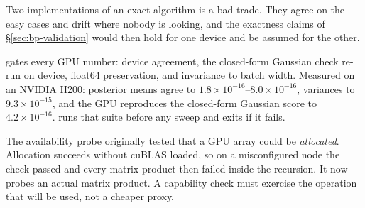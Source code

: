 \begin{intuition}
Two implementations of an exact algorithm is a bad trade. They agree on the easy cases and
drift where nobody is looking, and the exactness claims of \S\ref{sec:bp-validation} would then
hold for one device and be assumed for the other.
\end{intuition}

\begin{codebox}
 gates every GPU number: device agreement, the
closed-form Gaussian check re-run on device, float64 preservation, and invariance to batch
width. Measured on an NVIDIA H200: posterior means agree to $1.8\times10^{-16}$--$8.0\times10^{-16}$,
variances to $9.3\times10^{-15}$, and the GPU reproduces the closed-form Gaussian score to
$4.2\times10^{-16}$.  runs that suite before any sweep and
exits if it fails.
\end{codebox}

\begin{pitfall}
The availability probe originally tested that a GPU array could be \emph{allocated}. Allocation
succeeds without cuBLAS loaded, so on a misconfigured node the check passed and every matrix
product then failed inside the recursion. It now probes an actual matrix product. A capability
check must exercise the operation that will be used, not a cheaper proxy.
\end{pitfall}

